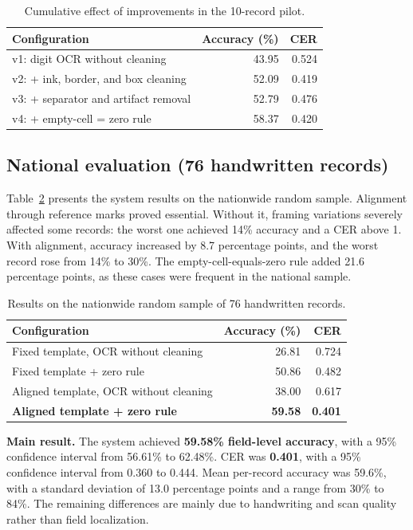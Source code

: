 \documentclass[conference]{IEEEtran}
\begin{document}
\begin{table}[t]
\caption{Cumulative effect of improvements in the 10-record pilot.}
\label{tab:pilot}
\centering
\begin{tabular}{lrr}
\toprule
Configuration & Accuracy (\%) & CER \\
\midrule
v1: digit OCR without cleaning & 43.95 & 0.524 \\
v2: + ink, border, and box cleaning & 52.09 & 0.419 \\
v3: + separator and artifact removal & 52.79 & 0.476 \\
v4: + empty-cell = zero rule & 58.37 & 0.420 \\
\bottomrule
\end{tabular}
\end{table}

\subsection{National evaluation (76 handwritten records)}
Table~\ref{tab:national} presents the system results on the nationwide random
sample. Alignment through reference marks proved essential. Without it, framing
variations severely affected some records: the worst one achieved 14\% accuracy
and a CER above 1. With alignment, accuracy increased by 8.7 percentage points,
and the worst record rose from 14\% to 30\%. The empty-cell-equals-zero rule
added 21.6 percentage points, as these cases were frequent in the national
sample.

\begin{table}[t]
\caption{Results on the nationwide random sample of 76 handwritten records.}
\label{tab:national}
\centering
\begin{tabular}{lrr}
\toprule
Configuration & Accuracy (\%) & CER \\
\midrule
Fixed template, OCR without cleaning & 26.81 & 0.724 \\
Fixed template + zero rule & 50.86 & 0.482 \\
Aligned template, OCR without cleaning & 38.00 & 0.617 \\
\textbf{Aligned template + zero rule} & \textbf{59.58} & \textbf{0.401} \\
\bottomrule
\end{tabular}
\end{table}

\textbf{Main result.} The system achieved \textbf{59.58\% field-level
accuracy}, with a 95\% confidence interval from 56.61\% to 62.48\%. CER was
\textbf{0.401}, with a 95\% confidence interval from 0.360 to 0.444. Mean
per-record accuracy was 59.6\%, with a standard deviation of 13.0 percentage
points and a range from 30\% to 84\%. The remaining differences are mainly due
to handwriting and scan quality rather than field localization.
\end{document}
